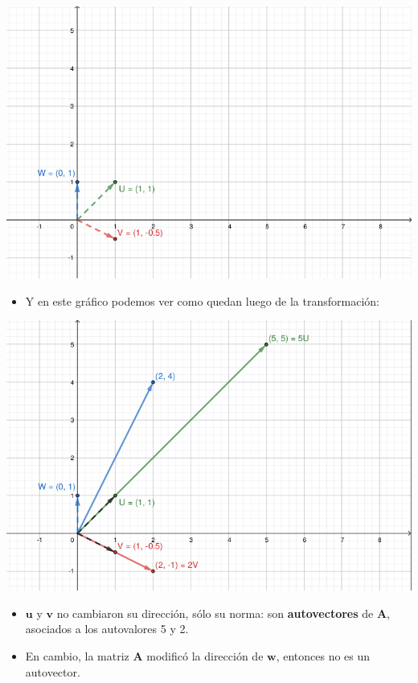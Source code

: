 \documentclass[openany]{book}
\providecommand{\tightlist}{%
  \setlength{\itemsep}{0pt}\setlength{\parskip}{0pt}}
\begin{document}
\begin{center}\includegraphics[width=1\linewidth]{Plots/U5/auto1} \end{center}

\begin{itemize}
\tightlist
\item
  Y en este gráfico podemos ver como quedan luego de la transformación:
\end{itemize}

\begin{center}\includegraphics[width=1\linewidth]{Plots/U5/auto2} \end{center}

\begin{itemize}
\item
  \(\textbf{u}\) y \(\textbf{v}\) no cambiaron su dirección, sólo su norma: son \textbf{autovectores} de \(\textbf{A}\), asociados a los autovalores 5 y 2.
\item
  En cambio, la matriz \(\textbf{A}\) modificó la dirección de \(\textbf{w}\), entonces no es un autovector.
\end{itemize}
\end{document}
